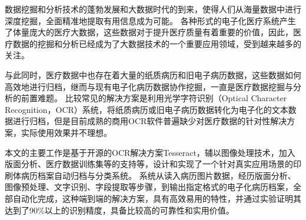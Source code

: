 ﻿\begin{cnabstract}
数据挖掘和分析技术的蓬勃发展和大数据时代的到来，使得人们从海量数据中进行深度挖掘，全面精准地提取有用信息成为可能。
各种形式的电子化医疗系统产生了体量庞大的医疗大数据，这些数据对于提升医疗质量有着重要的价值，因此，医疗数据的挖掘和分析已经成为了大数据技术的一个重要应用领域，受到越来越多的关注。

与此同时，医疗数据中也存在着大量的纸质病历和旧电子病历数据，这些数据如何高效地进行归档，继而与现有电子化病历数据协作挖掘，一直是医疗数据挖掘与分析的前置难题。
比较常见的解决方案是利用光学字符识别（Optical Character Recognition，OCR）系统，将纸质病历或旧电子病历数据转化为电子化的文本数据进行归档，但是目前成熟的商用OCR软件普遍缺少对医疗数据的针对性解决方案，实际使用效果并不理想。

本文的主要工作是基于开源的OCR解决方案Tesseract，辅以图像处理技术，加入版面分析、医疗数据训练集等的支持等，设计和实现了一个针对真实应用场景的印刷体病历档案自动归档与分类系统。
系统从读入病历图片数据，经历版面分析、图像预处理、文字识别、字段提取等步骤，到输出指定格式的电子化病历档案，全部自动化完成，这种端到端的解决方案，具有高效易用的特性，并通过实验证明其达到了90\%以上的识别精度，具备比较高的可靠性和实用价值。

\end{cnabstract}

